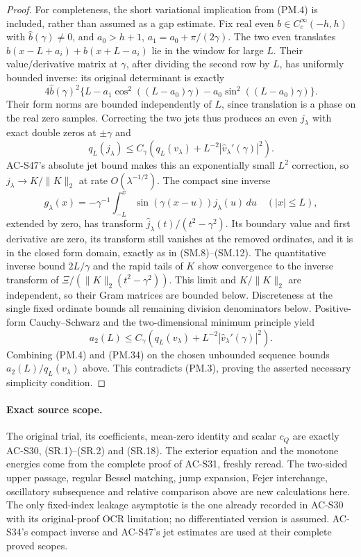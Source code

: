 \begin{proof}
For completeness, the short variational implication from (PM.4) is
included, rather than assumed as a gap estimate.  Fix real even
\(b\in C_c^\infty(-h,h)\) with \(\widehat b(\gamma)\ne0\), and
\(a_0>h+1\), \(a_1=a_0+\pi/(2\gamma)\).
The two even translates
\(b(x-L+a_i)+b(x+L-a_i)\) lie in the window for large \(L\).
Their value/derivative matrix at \(\gamma\), after dividing the second
row by \(L\), has uniformly bounded inverse: its original determinant
is exactly
\[
 4\widehat b(\gamma)^2
   \{L-a_1\cos^2((L-a_0)\gamma)-a_0\sin^2((L-a_0)\gamma)\}.
\]
Their form norms are bounded independently of \(L\), since translation
is a phase on the real zero samples.  Correcting the two jets thus
produces an even \(j_\lambda\) with exact double zeros at \(\pm\gamma\)
and
\[
 q_L(j_\lambda)\le C_\gamma
     \left(q_L(v_\lambda)+L^{-2}|\widehat v_\lambda'(\gamma)|^2\right).
 \tag{PM.33}
\]
AC-S47's absolute jet bound makes this an exponentially small \(L^2\)
correction, so \(j_\lambda\to K/\|K\|_2\) at rate
\(O(\lambda^{-1/2})\).  The compact sine inverse
\[
 g_\lambda(x)=-\gamma^{-1}\int_{-L}^x
           \sin(\gamma(x-u))j_\lambda(u)\,du\quad(|x|\le L),
\]
extended by zero, has transform
\(\widehat j_\lambda(t)/(t^2-\gamma^2)\).
Its boundary value and first derivative are zero, its transform still
vanishes at the removed ordinates, and it is in the closed form domain,
exactly as in (SM.8)--(SM.12).  The quantitative inverse bound
\(2L/\gamma\) and the rapid tails of \(K\) show convergence to the
inverse transform of \(\Xi/(\|K\|_2(t^2-\gamma^2))\).
This limit and \(K/\|K\|_2\) are independent, so their Gram matrices
are bounded below.  Discreteness at the single fixed ordinate bounds
all remaining division denominators below.  Positive-form
Cauchy--Schwarz and the two-dimensional minimum principle yield
\[
 a_2(L)\le C_\gamma
       \left(q_L(v_\lambda)+L^{-2}|\widehat v_\lambda'(\gamma)|^2\right).
 \tag{PM.34}
\]
Combining (PM.4) and (PM.34) on the chosen unbounded sequence bounds
\(a_2(L)/q_L(v_\lambda)\) above.  This contradicts (PM.3), proving
the asserted necessary simplicity condition.
\end{proof}

\paragraph{Exact source scope.}
The original trial, its coefficients, mean-zero identity and scalar
\(c_Q\) are exactly AC-S30, (SR.1)--(SR.2) and (SR.18).
The exterior equation and the monotone energies come from the complete
proof of AC-S31, freshly reread.  The two-sided upper passage, regular
Bessel matching, jump expansion, Fejer interchange, oscillatory
subsequence and relative comparison above are new calculations here.
The only fixed-index leakage asymptotic is the one already recorded in
AC-S30 with its original-proof OCR limitation; no differentiated version
is assumed.  AC-S34's compact inverse and AC-S47's jet estimates are
used at their complete proved scopes.

